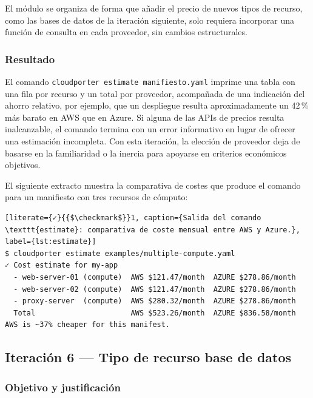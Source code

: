 El módulo se organiza de forma que añadir el precio de nuevos tipos de recurso, como las bases
de datos de la iteración siguiente, solo requiera incorporar una función de consulta en cada
proveedor, sin cambios estructurales.

\subsubsection{Resultado}

El comando \texttt{cloudporter estimate manifiesto.yaml} imprime una tabla con una fila por recurso y
un total por proveedor, acompañada de una indicación del ahorro relativo, por ejemplo, que un
despliegue resulta aproximadamente un 42\,\% más barato en AWS que en Azure. Si alguna de las
APIs de precios resulta inalcanzable, el comando termina con un error informativo en lugar de
ofrecer una estimación incompleta. Con esta iteración, la elección de proveedor deja de basarse
en la familiaridad o la inercia para apoyarse en criterios económicos objetivos.

El siguiente extracto muestra la comparativa de costes que produce el comando para un manifiesto
con tres recursos de cómputo:

\begin{lstlisting}[literate={✓}{{$\checkmark$}}1, caption={Salida del comando \texttt{estimate}: comparativa de coste mensual entre AWS y Azure.}, label={lst:estimate}]
$ cloudporter estimate examples/multiple-compute.yaml
✓ Cost estimate for my-app
  - web-server-01 (compute)  AWS $121.47/month  AZURE $278.86/month
  - web-server-02 (compute)  AWS $121.47/month  AZURE $278.86/month
  - proxy-server  (compute)  AWS $280.32/month  AZURE $278.86/month
  Total                      AWS $523.26/month  AZURE $836.58/month
AWS is ~37% cheaper for this manifest.
\end{lstlisting}

\subsection{Iteración 6 — Tipo de recurso base de datos}
\label{sec:iter6}

\subsubsection{Objetivo y justificación}

